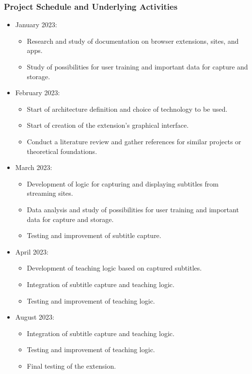 \documentclass[12pt]{article}
\begin{document}
\subsubsection{Project Schedule and Underlying Activities}
\begin{itemize}

\item January 2023:
\begin{itemize}
\item Research and study of documentation on browser extensions, sites, and apps.
\item Study of possibilities for user training and important data for capture and storage.
\end{itemize}

\item February 2023:
\begin{itemize}
\item Start of architecture definition and choice of technology to be used.
\item Start of creation of the extension's graphical interface.
\item Conduct a literature review and gather references for similar projects or theoretical foundations.
\end{itemize}

\item March 2023:
\begin{itemize}
\item Development of logic for capturing and displaying subtitles from streaming sites.
\item Data analysis and study of possibilities for user training and important data for capture and storage.
\item Testing and improvement of subtitle capture.
\end{itemize}

\item April 2023:
\begin{itemize}
\item Development of teaching logic based on captured subtitles.
\item Integration of subtitle capture and teaching logic.
\item Testing and improvement of teaching logic.
\end{itemize}

\item August 2023:
\begin{itemize}
\item Integration of subtitle capture and teaching logic.
\item Testing and improvement of teaching logic.
\item Final testing of the extension.
\end{itemize}


\end{itemize}
\end{document}
